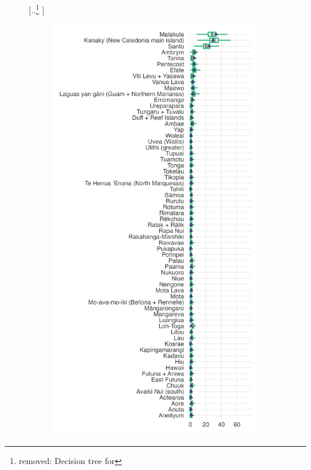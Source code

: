\documentclass[unnumsec,webpdf,modern,medium]{oup-authoring-template}
\providecommand{\DIFdeltex}[1]{{\protect\color{red} [..\footnote{removed: #1} ]}} %
\providecommand{\DIFdelbegin}{} %
\providecommand{\DIFdelFL}[1]{\DIFdel{#1}} %
\providecommand{\DIFaddbeginFL}{} %
\providecommand{\DIFaddendFL}{} %
\providecommand{\DIFdelbeginFL}{} %
\providecommand{\DIFdelendFL}{} %
\providecommand{\DIFdel}[1]{\texorpdfstring{\DIFdeltex{#1}}{}} %
\newcommand{\DIFscaledelfig}{0.5}
\newlength{\DIFdelgraphicswidth} %
\newlength{\DIFdelgraphicsheight} %
\newcommand{\DIFaddincludegraphics}[2][]{{\color{blue}\fbox{\DIFOincludegraphics[#1]{#2}}}} %
\newcommand{\DIFdelincludegraphics}[2][]{%
\sbox{\DIFdelgraphicsbox}{\DIFOincludegraphics[#1]{#2}}%
\settoboxwidth{\DIFdelgraphicswidth}{\DIFdelgraphicsbox} %
\settoboxtotalheight{\DIFdelgraphicsheight}{\DIFdelgraphicsbox} %
\scalebox{\DIFscaledelfig}{%
\parbox[b]{\DIFdelgraphicswidth}{\usebox{\DIFdelgraphicsbox}\\[-\baselineskip] \rule{\DIFdelgraphicswidth}{0em}}\llap{\resizebox{\DIFdelgraphicswidth}{\DIFdelgraphicsheight}{%
\setlength{\unitlength}{\DIFdelgraphicswidth}%
\begin{picture}(1,1)%
\thicklines\linethickness{2pt} %
{\color[rgb]{1,0,0}\put(0,0){\framebox(1,1){}}}%
{\color[rgb]{1,0,0}\put(0,0){\line( 1,1){1}}}%
{\color[rgb]{1,0,0}\put(0,1){\line(1,-1){1}}}%
\end{picture}%
}\hspace*{3pt}}} %
} %
\DeclareRobustCommand{\DIFdelbegin}{\DIFOdelbegin \let\includegraphics\DIFdelincludegraphics} %
\DeclareRobustCommand{\DIFaddbeginFL}{\DIFOaddbeginFL \let\includegraphics\DIFaddincludegraphics} %
\DeclareRobustCommand{\DIFaddendFL}{\DIFOaddendFL \let\includegraphics\DIFOincludegraphics} %
\DeclareRobustCommand{\DIFdelbeginFL}{\DIFOdelbeginFL \let\includegraphics\DIFdelincludegraphics} %
\DeclareRobustCommand{\DIFdelendFL}{\DIFOaddendFL \let\includegraphics\DIFOincludegraphics} %
\begin{document}
\DIFdelbegin %
\DIFdelendFL \DIFaddbeginFL \begin{figure}
\DIFaddendFL \centering
\DIFdelbeginFL %
\DIFdelFL{Decision tree for }\DIFdelendFL \DIFaddbeginFL \begin{subfigure}{0.48\textwidth}
  \centering
\includegraphics[width=1\textwidth]{latex/brms_predict_medium_control_spatialphylo.png}

\end{subfigure}
\end{figure}
\end{document}
